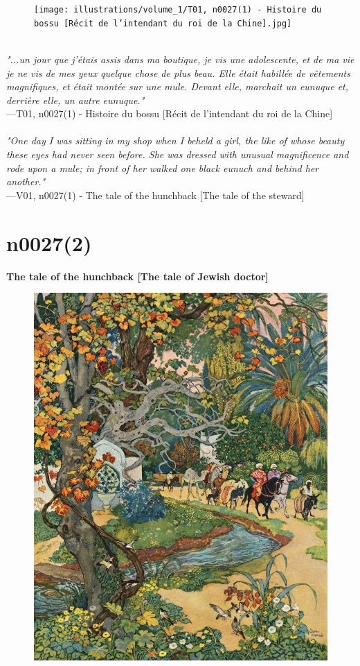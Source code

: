 \documentclass[../Carre_nights.tex]{subfiles}
\begin{document}
\begin{figure}[ht]
\centering
\texttt{[image: illustrations/volume\_1/T01, n0027(1) - Histoire du bossu [Récit de l'intendant du roi de la Chine].jpg]}
\end{figure}

\textit{\\
"...un jour que j’étais assis dans ma boutique, je vis une adolescente, et de ma vie je ne vis de mes yeux quelque chose de plus beau. Elle était habillée de vêtements magnifiques, et était montée sur une mule. Devant elle, marchait un eunuque et, derrière elle, un autre eunuque."} \\
—T01, n0027(1) - Histoire du bossu [Récit de l'intendant du roi de la Chine] \\~\\
\textit{"One day I was sitting in my shop when I beheld a girl, the like of whose beauty these eyes had never seen before. She was dressed with unusual magnificence and rode upon a mule; in front of her walked one black eunuch and behind her another."} \\
—V01, n0027(1) - The tale of the hunchback [The tale of the steward]

\newpage

\section{n0027(2)}
\textbf{\Large{The tale of the hunchback [The tale of Jewish doctor]}} \\

\begin{figure}[ht]
\centering
\includegraphics[height=\figsize]{illustrations/volume_1/T01, n0027(2) - Histoire du bossu [Récit du médecin juif].jpg}
\end{figure}
\end{document}

